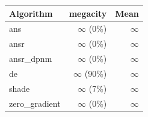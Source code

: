 \begin{tabular}{lrr}
\toprule
Algorithm & megacity & Mean \\
\midrule
ans & $\infty$ (0\%) & $\infty$ \\
ansr & $\infty$ (0\%) & $\infty$ \\
ansr\_dpnm & $\infty$ (0\%) & $\infty$ \\
de & $\infty$ (90\%) & $\infty$ \\
shade & $\infty$ (7\%) & $\infty$ \\
zero\_gradient & $\infty$ (0\%) & $\infty$ \\
\bottomrule
\end{tabular}
